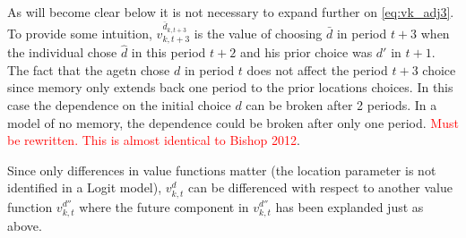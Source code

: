 As will become clear below it is not necessary to expand further on \eqref{eq:vk_adj3}. To provide some intuition, $v_{k,t+3}^{\bar{d}_{k,t+3}}$ is the value of choosing $\bar{d}$ in period $t+3$ when the individual chose $\hat{d}$ in this period $t+2$ and his prior choice was $d'$ in $t+1$. The fact that the agetn chose $d$ in period $t$ does not affect the period $t+3$ choice since memory only extends back one period to the prior locations choices. In this case the dependence on the initial choice $d$ can be broken after 2 periods. In a model of no memory, the dependence could be broken after only one period. \textcolor{red}{Must be rewritten. This is almost identical to Bishop 2012}.

Since only differences in value functions matter (the location parameter is not identified in a Logit model), $v_{k,t}^d$ can be differenced with respect to another value function $v_{k,t}^{d''}$ where the future component in $v_{k,t}^{d''}$ has been explanded just as above.  
